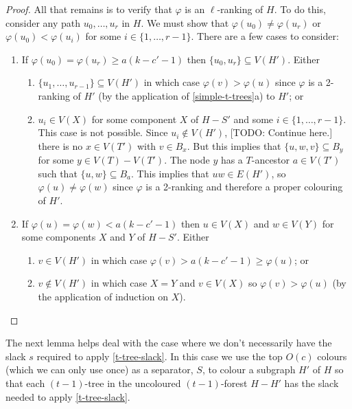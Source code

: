 \documentclass[kpfonts]{patmorin}
\theoremstyle{named}
\newcommand{\weirdref}[2]{\cref{#1}#2}
\begin{document}
\begin{proof}
   All that remains is to verify that $\varphi$ is an $\ell$-ranking of $H$. To do this, consider any path $u_0,\ldots,u_r$ in $H$.  We must show that $\varphi(u_0)\neq \varphi(u_r)$ or $\varphi(u_0)<\varphi(u_i)$ for some $i\in\{1,\ldots,r-1\}$.  There are a few cases to consider:
   \begin{enumerate}
    \item If $\varphi(u_0)=\varphi(u_r) \ge a(k-c'-1)$ then $\{u_0,u_r\}\subseteq V(H')$. Either
    \begin{enumerate}
       \item $\{u_1,\ldots,u_{r-1}\}\subseteq V(H')$ in which case $\varphi(v)>\varphi(u)$ since $\varphi$ is a 2-ranking of $H'$ (by the application of \weirdref{simple-t-trees}{a}) to $H'$; or
       \item $u_i\in V(X)$ for some component $X$ of $H-S'$ and some $i\in\{1,\ldots,r-1\}$. This case is not possible.  Since $u_i\not\in V(H')$, [TODO: Continue here.] there is no $x\in V(T')$ with $v\in B_x$.  But this implies that $\{u,w,v\}\subseteq B_y$ for some $y\in V(T)-V(T')$.  The node $y$ has a $T$-ancestor $a\in V(T')$ such that $\{u,w\}\subseteq B_a$. This implies that $uw\in E(H')$, so $\varphi(u)\neq\varphi(w)$ since $\varphi$ is a 2-ranking and therefore a proper colouring of $H'$.
   \end{enumerate}
   \item If $\varphi(u)=\varphi(w) < a(k-c'-1)$ then $u\in V(X)$ and $w\in V(Y)$ for some components $X$ and $Y$ of $H-S'$.  Either
   \begin{enumerate}
    \item $v\in V(H')$ in which case $\varphi(v)>a(k-c'-1)\ge\varphi(u)$; or
    \item $v\not\in V(H')$ in which case $X=Y$ and $v\in V(X)$ so $\varphi(v)>\varphi(u)$ (by the application of induction on $X$). \qedhere
    \end{enumerate}
   \end{enumerate}
\end{proof}

The next lemma helps deal with the case where we don't necessarily have the slack $s$ required to apply \cref{t-tree-slack}.  In this case we use the top $O(c)$ colours (which we can only use once) as a separator, $S$, to colour a subgraph $H'$ of $H$ so that each $(t-1)$-tree in the uncoloured $(t-1)$-forest $H-H'$ has the slack needed to apply \cref{t-tree-slack}.
\end{document}
